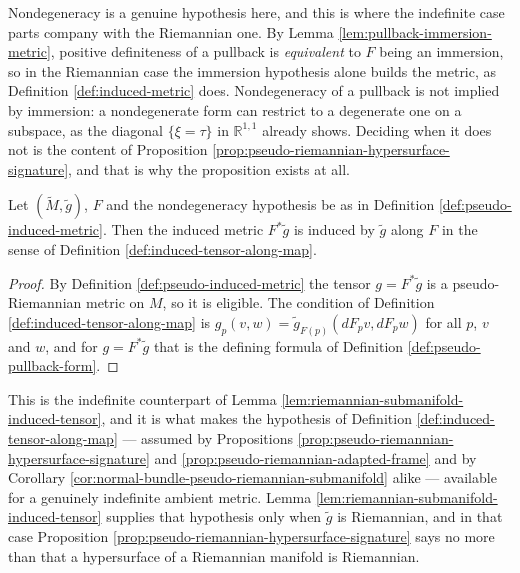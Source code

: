 Nondegeneracy is a genuine hypothesis here, and this is where the indefinite case parts company with the Riemannian one. By Lemma \ref{lem:pullback-immersion-metric}, positive definiteness of a pullback is \emph{equivalent} to $F$ being an immersion, so in the Riemannian case the immersion hypothesis alone builds the metric, as Definition \ref{def:induced-metric} does. Nondegeneracy of a pullback is not implied by immersion: a nondegenerate form can restrict to a degenerate one on a subspace, as the diagonal $\{\xi = \tau\}$ in $\mathbb{R}^{1,1}$ already shows. Deciding when it does not is the content of Proposition \ref{prop:pseudo-riemannian-hypersurface-signature}, and that is why the proposition exists at all.

\begin{lemma}
\label{lem:pseudo-riemannian-submanifold-induced-tensor}
\leanok
{}
Let $(\tilde{M},\tilde{g})$, $F$ and the nondegeneracy hypothesis be as in Definition \ref{def:pseudo-induced-metric}. Then the induced metric $F^*\tilde{g}$ is induced by $\tilde{g}$ along $F$ in the sense of Definition \ref{def:induced-tensor-along-map}.
\end{lemma}

\begin{proof}
\leanok
{}
By Definition \ref{def:pseudo-induced-metric} the tensor $g = F^*\tilde{g}$ is a pseudo-Riemannian metric on $M$, so it is eligible. The condition of Definition \ref{def:induced-tensor-along-map} is $g_p(v,w) = \tilde{g}_{F(p)}(dF_pv, dF_pw)$ for all $p$, $v$ and $w$, and for $g = F^*\tilde{g}$ that is the defining formula of Definition \ref{def:pseudo-pullback-form}.
\end{proof}

This is the indefinite counterpart of Lemma \ref{lem:riemannian-submanifold-induced-tensor}, and it is what makes the hypothesis of Definition \ref{def:induced-tensor-along-map} --- assumed by Propositions \ref{prop:pseudo-riemannian-hypersurface-signature} and \ref{prop:pseudo-riemannian-adapted-frame} and by Corollary \ref{cor:normal-bundle-pseudo-riemannian-submanifold} alike --- available for a genuinely indefinite ambient metric. Lemma \ref{lem:riemannian-submanifold-induced-tensor} supplies that hypothesis only when $\tilde{g}$ is Riemannian, and in that case Proposition \ref{prop:pseudo-riemannian-hypersurface-signature} says no more than that a hypersurface of a Riemannian manifold is Riemannian.

